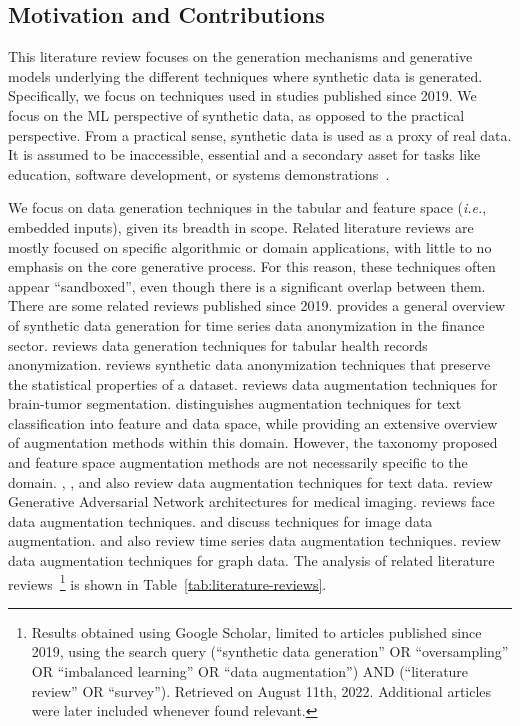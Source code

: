 \documentclass[parskip=full]{scrartcl}
\begin{document}

\subsection{Motivation and Contributions}

This literature review focuses on the generation mechanisms and generative
models underlying the different techniques where synthetic data is generated.
Specifically, we focus on techniques used in studies published since 2019.  We
focus on the ML perspective of synthetic data, as opposed to the practical
perspective. From a practical sense, synthetic data is used as a proxy of real
data. It is assumed to be inaccessible, essential and a secondary asset for
tasks like education, software development, or systems
demonstrations~\cite{mannino2019real}. 

We focus on data generation techniques in the tabular and feature space
(\textit{i.e.}, embedded inputs), given its breadth in scope. Related
literature reviews are mostly focused on specific algorithmic or domain
applications, with little to no emphasis on the core generative process. For
this reason, these techniques often appear ``sandboxed'', even though there is
a significant overlap between them. There are some related reviews published
since 2019. \citet{assefa2020generating} provides a general overview of
synthetic data generation for time series data anonymization in the finance
sector. \citet{hernandez2022synthetic} reviews data generation techniques for
tabular health records anonymization. \citet{raghunathan2021synthetic} reviews
synthetic data anonymization techniques that preserve the statistical
properties of a dataset. \citet{nalepa2019data} reviews data augmentation
techniques for brain-tumor segmentation. \citet{bayer2021survey} distinguishes
augmentation techniques for text classification into feature and data space,
while providing an extensive overview of augmentation methods within this
domain. However, the taxonomy proposed and feature space augmentation methods
are not necessarily specific to the domain. \citet{shorten2021text},
\citet{chen2021empirical}, \citet{feng2021survey} and \citet{liu2020survey}
also review data augmentation techniques for text data.
\citet{yi2019generative} review Generative Adversarial Network architectures
for medical imaging. \citet{wang2020survey} reviews face data augmentation
techniques. \citet{shorten2019survey} and \citet{khosla2020enhancing} discuss
techniques for image data augmentation. \citet{iwana2021empirical} and
\citet{wen2020time} also review time series data augmentation techniques.
\citet{zhao2022graph} review data augmentation techniques for graph data. The
analysis of related literature reviews~\footnote{%
    Results obtained using Google Scholar, limited to articles published since
    2019, using the search query {\selectfont (``synthetic
    data generation'' OR ``oversampling'' OR ``imbalanced learning'' OR ``data
    augmentation'') AND (``literature review'' OR ``survey'')}. Retrieved on
    August 11th, 2022. Additional articles were later included whenever
    found relevant.
} is shown in Table~\ref{tab:literature-reviews}.
\end{document}
